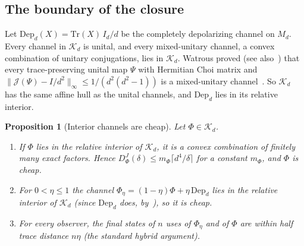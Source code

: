 \documentclass[11pt,a4paper]{article}
\theoremstyle{plain}
\newtheorem{proposition}[theorem]{Proposition}
\theoremstyle{definition}
\theoremstyle{remark}
\newcommand{\DChoi}{D^{J}}
\begin{document}
\subsection{The boundary of the closure}\label{sec:boundary}

Let $\mathrm{Dep}_d(X)=\mathrm{Tr}(X)\,I_d/d$ be the completely depolarizing channel on $M_d$. Every channel in $\mathcal K_d$ is unital, and every
mixed-unitary channel, a convex combination of unitary conjugations, lies in $\mathcal K_d$. Watrous proved (see also~\cite{AudenaertScheel2008}) that every trace-preserving unital map
$\Psi$ with Hermitian Choi matrix and $\|\mathcal J(\Psi)-I/d^2\|_\infty\le1/(d^2(d^2-1))$ is a mixed-unitary channel~\cite[Corollary~2]{Watrous2009}.
So $\mathcal K_d$ has the same affine hull as the unital channels, and $\mathrm{Dep}_d$ lies in its relative interior.

\begin{proposition}[Interior channels are cheap]\label{prop:boundary}
Let $\Phi\in\mathcal K_d$.
\begin{enumerate}[label=(\alph*)]
\item If $\Phi$ lies in the relative interior of $\mathcal K_d$, it is a convex combination of finitely many exact factors. Hence
$\DChoi_\Phi(\delta)\le m_\Phi\lceil d^4/\delta\rceil$ for a constant $m_\Phi$, and $\Phi$ is cheap.
\item For $0<\eta\le1$ the channel $\Phi_\eta=(1-\eta)\Phi+\eta\,\mathrm{Dep}_d$ lies in the relative interior of $\mathcal K_d$ (since
$\mathrm{Dep}_d$ does, by~\cite[Corollary~2]{Watrous2009}), so it is cheap.
\item For every observer, the final states of $n$ uses of $\Phi_\eta$ and of $\Phi$ are within half trace distance $n\eta$ (the standard hybrid
argument).
\end{enumerate}
\end{proposition}
\end{document}
